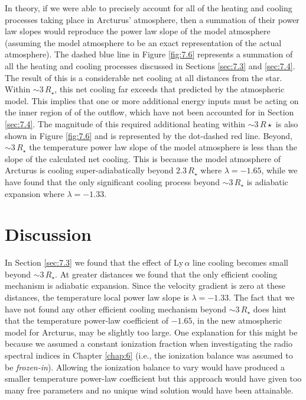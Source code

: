 In theory, if we were able to precisely account for all of the heating and cooling processes taking place in Arcturus' atmosphere, then a summation of their power law slopes would reproduce the power law slope of the model atmosphere (assuming the model atmosphere to be an exact representation of the actual atmosphere). The dashed blue line in Figure \ref{fig:7.6} represents a summation of all the heating and cooling processes discussed in Sections  \ref{sec:7.3} and \ref{sec:7.4}. The result of this is a considerable net cooling at all distances from the star. Within $\sim 3\,R_{\star}$, this net cooling far exceeds that predicted by the atmospheric model. This implies that one or more additional energy inputs must be acting on the inner region of of the outflow, which have not been accounted for in Section \ref{sec:7.4}. The magnitude of this required additional heating within $\sim 3\,R{\star}$ is also shown in Figure \ref{fig:7.6} and is represented by the dot-dashed red line. Beyond, $\sim 3\,R_{\star}$ the temperature power law slope of the model atmosphere is less than the slope of the calculated net cooling. This is because the model atmosphere of Arcturus is cooling super-adiabatically beyond $2.3\,R_{\star}$ where $\lambda = -1.65$, while we have found that the only significant cooling process beyond $\sim 3\,R_{\star}$ is adiabatic expansion where $\lambda = -1.33$. 

\section{Discussion}\label{sec:7.6}
In Section \ref{sec:7.3} we found that the effect of Ly\,$\alpha$ line cooling becomes small beyond $\sim 3\,R_{\star}$. At greater distances we found that the only efficient cooling mechanism is adiabatic expansion. Since the velocity gradient is zero at these distances, the temperature local power law slope is $\lambda = -1.33$. The fact that we have not found any other efficient cooling mechanism beyond $\sim 3\,R_{\star}$ does hint that the temperature power-law coefficient of $-1.65$, in the new atmospheric model for Arcturus, may be slightly too large. One explanation for this might be because we assumed a constant ionization fraction when investigating the radio spectral indices in Chapter \ref{chap:6} (i.e., the ionization balance was assumed to be \textit{frozen-in}). Allowing the ionization balance to vary would have produced a smaller temperature power-law coefficient but this approach would have given too many free parameters and no unique wind solution would have been attainable. 

